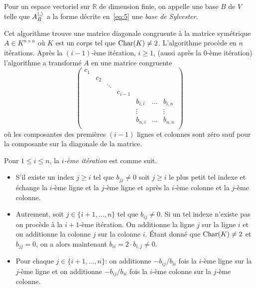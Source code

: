 \begin{definition}
  \label{def:37}
  Pour un espace vectoriel sur $ℝ$ de dimension finie, on appelle une base $B$ de $V$ telle que $A_B^{\langle {,} \rangle}$ a la forme décrite en~\eqref{eq:5} une \emph{base de Sylvester}. 
\end{definition}



\begin{algorithm}
  \label{alg:1}
  Cet algorithme trouve une matrice diagonale congruente à la matrice symétrique $A \in K^{n \times n}$ où $K$ est un corps tel que $\mathrm{Char}(K) \neq 2$.  L'algorithme procède en $n$ itérations. Après la $(i-1)$-ème itération, $i \geq 1$, (aussi après  la $0$-ème itération) l'algorithme a transformé $A$ en une matrice congruente 
  \begin{equation}
    \label{eq:7}
    \begin{pmatrix}
      c_1 \\
      & c_2 \\
      & & \ddots & &&\\
      & & & c_{i-1} \\
      & & & &  b_{i,i} & \dots & b_{i,n} \\
      & & & &     \vdots       &  & \vdots \\
      & & & &  b_{n,i} & \dots & b_{n,n} \\      
    \end{pmatrix}
  \end{equation}
où les composantes des premières $(i-1)$ lignes et colonnes sont zéro sauf pour la composante sur la diagonale de la matrice. 

\medskip 
\noindent 
Pour $1 \leq i \leq n$, la \emph{$i$-ème itération}  est comme suit. 
\begin{itemize}
\item S'il existe un index $j≥i$ tel que $b_{jj} \neq 0$ soit $j ≥i$ le plus petit tel indexe et  échange la $i$-ème ligne et la $j$-ème ligne et après    la $i$-ème colonne et la $j$-ème colonne. 
\item Autrement, soit $j \in \{i+1,\dots,n\}$ tel que $b_{ij} \neq 0$. 
  Si un tel indexe n'existe pas on procède à la $i+1$-ème itération. 
  On additionne la ligne $j$ sur la ligne $i$ et on additionne la colonne $j$ sur la colonne $i$. Étant donné que $\mathrm{Char}(K) \neq 2$ et $b_{jj}=0$, on a alors maintenant $b_{ii} = 2 ⋅ b_{i,j} \neq 0$. 
\item Pour chaque $j \in \{i+1,\dots,n\}$:  on additionne $-b_{ij}/b_{ii}$ fois la $i$-ème ligne sur la $j$-ème ligne et on additionne $-b_{ij}/b_{ii}$ fois la $i$-ème colonne sur la $j$-ème colonne. 
\end{itemize}   


\end{algorithm}



